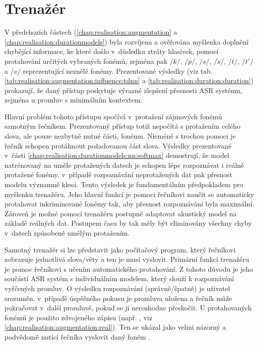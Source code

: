 \section{Trenažér}
\label{chap:realisation:trainer}

V předchozích částech (\ref{chap:realisation:augmentation} a \ref{chap:realisation:durationmodels}) byla rozvíjena a ověřována myšlenka doplnění chybějící informace, ke které došlo v~důsledku ztráty hlasivek, pomocí protahování určitých vybraných fonémů, zejména pak $/k/$, $/p/$, $/s/$, $/\check{s}/$, $/t/$, $/t'/$ a $/v/$ reprezentující neznělé fonémy. Prezentované výsledky (viz tab. \ref{tab:realisation:augmentation:influence:tdnn} a \ref{tab:realisation:duration:duration}) prokazují, že daný přístup poskytuje výrazné zlepšení přesnosti ASR systému, zejména u promluv s minimálním kontextem.

Hlavní problém tohoto přístupu spočívá v~protažení zájmových fonémů samotným řečníkem. Prezentovaný přístup totiž nepočítá s protažením celého slova, ale pouze nezbytně nutné části, fonému. Nicméně s trochou pomoci je řečník schopen protáhnout požadovanou část slova. Výsledky prezentované v~části \ref{chap:realisation:durationmodels:nn:softmax} demostrují, že model natrénovaný na uměle protažených datech je schopen lépe rozpoznávat i reálně protažené fonémy. v~případě rozpoznávání neprotažených dat pak přesnost modelu významně klesá. Tento výsledek je fundamentálním předpokladem pro myšlenku trenažéru. Jeho hlavní funkcí je pomoci řečníkovi naučit se automaticky protahovat inkriminované fonémy tak, aby přesnost rozpoznávání byla maximální. Zároveň je možné pomocí trenažéru postupně adaptovat akustický model na základě reálných dat. Postupem času by tak měly být eliminovány všechny chyby v~datech způsobené umělým protažením.

Samotný trenažér si lze představit jako počítačový program, který řečníkovi zobrazuje jednotlivá slova/věty a ten je musí vyslovit. Primární funkcí trenažéru je pomoc řečníkovi s učením automatického protahování. Z tohoto důvodu je jeho součástí ASR systém s individuálním modelem, který slouží k rozpoznávání vyřčených promluv. O výsledku rozpoznávání (správně/špatně) je uživatel srozuměn. v~případě úspěšného pokusu je promluva uložena a řečník může pokračovat v~další promluvě, pokud se ji nerozhodne přeskočit. U protahovaných fonémů je použito zdvojeného zápisu (např. \textit{}, viz \ref{chap:realisation:augmentation:real}). Ten se ukázal jako velmi názorný a podvědomě nutící řečníka vyslovit daný foném .

